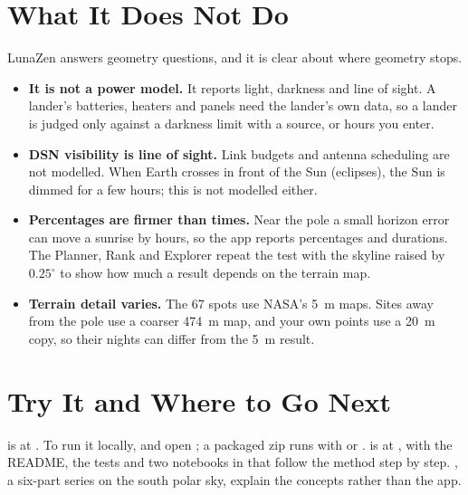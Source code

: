 \section{What It Does Not Do}\label{sec:limits}
LunaZen answers geometry questions, and it is clear about where geometry stops.
\begin{itemize}
\item \textbf{It is not a power model.} It reports light, darkness and line of sight. A lander's batteries, heaters and panels need the lander's own data, so a lander is judged only against a darkness limit with a source, or hours you enter.
\item \textbf{DSN visibility is line of sight.} Link budgets and antenna scheduling are not modelled. When Earth crosses in front of the Sun (eclipses), the Sun is dimmed for a few hours; this is not modelled either.
\item \textbf{Percentages are firmer than times.} Near the pole a small horizon error can move a sunrise by hours, so the app reports percentages and durations. The Planner, Rank and Explorer repeat the test with the skyline raised by $0.25^\circ$ to show how much a result depends on the terrain map.
\item \textbf{Terrain detail varies.} The 67 spots use NASA's 5~m maps. Sites away from the pole use a coarser 474~m map, and your own points use a 20~m copy, so their nights can differ from the 5~m result.
\end{itemize}

\section{Try It and Where to Go Next}\label{sec:reproduce}
 is at \appurl. To run it locally,  and open ; a packaged zip runs with  or .  is at \repourl, with the README, the tests and two notebooks in  that follow the method step by step. , a six-part series on the south polar sky, explain the concepts rather than the app.

